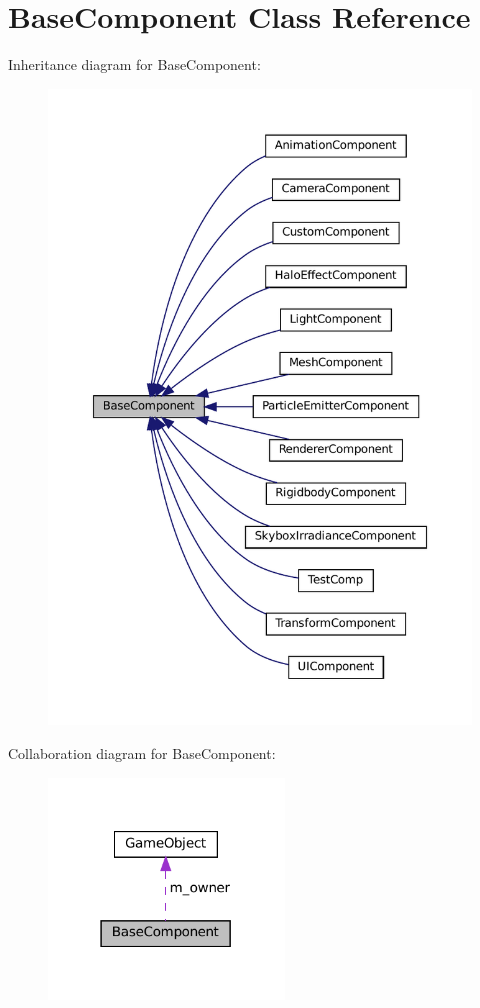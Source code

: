 \hypertarget{classBaseComponent}{}\section{Base\+Component Class Reference}
\label{classBaseComponent}


Inheritance diagram for Base\+Component\+:\nopagebreak
\begin{figure}[H]
\begin{center}
\leavevmode
\includegraphics[width=350pt]{classBaseComponent__inherit__graph}
\end{center}
\end{figure}


Collaboration diagram for Base\+Component\+:\nopagebreak
\begin{figure}[H]
\begin{center}
\leavevmode
\includegraphics[width=178pt]{classBaseComponent__coll__graph}
\end{center}
\end{figure}
